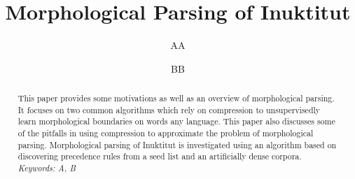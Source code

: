 \documentclass[runningheads,a4paper]{llncs}
\begin{document}
\mainmatter  %

\title{Morphological Parsing of Inuktitut}


%
%
\author{AA%
\and BB}
%


%
%

\maketitle


\begin{abstract}

This paper provides some motivations as well as an overview of morphological parsing. It  focuses on two common algorithms which rely on compression to unsupervisedly learn morphological boundaries on words any language. This paper also discusses some of the pitfalls in using compression to approximate the problem of morphological parsing. Morphological parsing of Inuktitut is investigated using an algorithm based on discovering precedence rules from a seed list and an artificially dense corpora. 
\emph{Keywords: A, B} 
\end{abstract}
\end{document}
